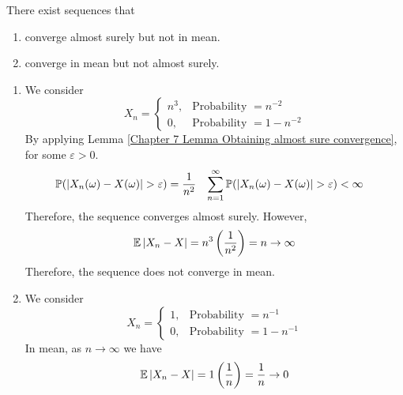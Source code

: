 \documentclass{huhtakm-template-book}
\newcommand{\prob}{\mathbb{P}}
\newcommand{\expect}{\mathbb{E}}
\begin{document}
    \begin{lem}
        \label{Chapter 7 Lemma Non-relationship between almost surely convergence and mean}
        There exist sequences that
        \begin{enumerate}
            \item converge almost surely but not in mean.
            \item converge in mean but not almost surely.
        \end{enumerate}
    \end{lem}
    \begin{proofing}
        \begin{enumerate}
            \item We consider
            \begin{equation*}
                X_{n}=\begin{cases}
                    n^{3}, &\text{Probability }=n^{-2}\\
                    0, &\text{Probability }=1-n^{-2}
                \end{cases}
            \end{equation*}
            By applying Lemma \ref{Chapter 7 Lemma Obtaining almost sure convergence}, for some $\varepsilon>0$.
            \begin{align*}
                \prob(\abs{X_{n}(\omega)-X(\omega)}>\varepsilon)&=\frac{1}{n^{2}} & \sum_{n=1}^{\infty}\prob(\abs{X_{n}(\omega)-X(\omega)}>\varepsilon)&<\infty
            \end{align*}
            Therefore, the sequence converges almost surely. However,
            \begin{equation*}
                \expect\abs{X_{n}-X}=n^{3}\left(\frac{1}{n^{2}}\right)=n\to\infty
            \end{equation*}
            Therefore, the sequence does not converge in mean.
            \item We consider
            \begin{equation*}
                X_{n}=\begin{cases}
                    1, &\text{Probability }=n^{-1}\\
                    0, &\text{Probability }=1-n^{-1}
                \end{cases}
            \end{equation*}
            In mean, as $n\to\infty$ we have
            \begin{equation*}
                \expect\abs{X_{n}-X}=1\left(\frac{1}{n}\right)=\frac{1}{n}\to 0

\end{equation*}
\end{enumerate}
\end{proofing}
\end{document}
